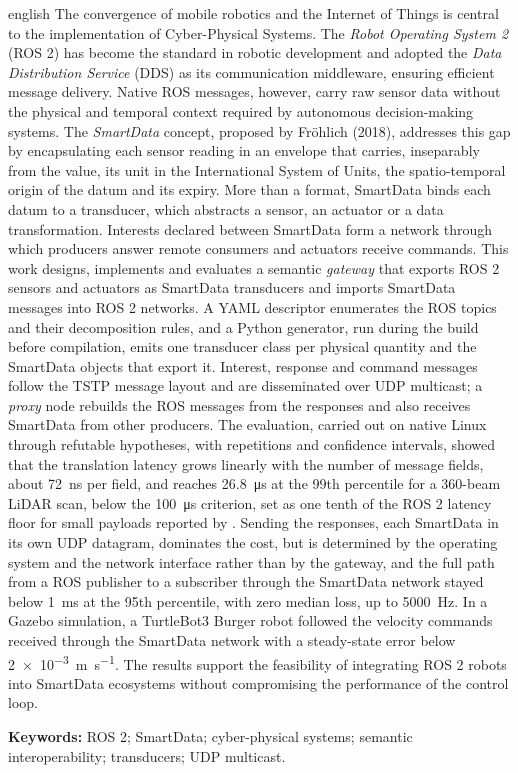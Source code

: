 \documentclass[
    12pt,
    oneside,
    a4paper,
    chapter=TITLE,
    section=TITLE,
    english,
    brazil
]{abntex2}
\begin{document}
\begin{resumo}[Abstract]
\begin{otherlanguage*}{english}
The convergence of mobile robotics and the Internet of Things is central to
the implementation of Cyber-Physical Systems. The \textit{Robot Operating
System 2} (ROS 2) has become the standard in robotic development and adopted
the \textit{Data Distribution Service} (DDS) as its communication middleware,
ensuring efficient message delivery. Native ROS messages, however, carry raw
sensor data without the physical and temporal context required by autonomous
decision-making systems. The \textit{SmartData} concept, proposed by
Fröhlich (2018), addresses this gap by encapsulating each sensor reading in
an envelope that carries, inseparably from the value, its unit in the
International System of Units, the spatio-temporal origin of the datum and
its expiry. More than a format, SmartData binds each datum to a transducer,
which abstracts a sensor, an actuator or a data transformation. Interests
declared between SmartData form a network through which producers answer
remote consumers and actuators receive commands. This work designs,
implements and evaluates a semantic \textit{gateway} that exports ROS 2
sensors and actuators as SmartData transducers and imports SmartData messages
into ROS 2 networks. A YAML descriptor enumerates the ROS topics and their
decomposition rules, and a Python generator, run during the build before
compilation, emits one transducer class per physical quantity and the
SmartData objects that export it. Interest, response and command messages
follow the TSTP message layout and are disseminated over UDP multicast; a
\textit{proxy} node rebuilds the ROS messages from the responses and also
receives SmartData from other producers. The evaluation, carried out on
native Linux through refutable hypotheses, with repetitions and confidence
intervals, showed that the translation latency grows linearly with the
number of message fields, about \SI{72}{\nano\second} per field, and reaches
\SI{26.8}{\micro\second} at the 99th percentile for a 360-beam LiDAR scan,
below the \SI{100}{\micro\second} criterion, set as one tenth of the ROS 2
latency floor for small payloads reported by
. Sending the responses, each SmartData in
its own UDP datagram, dominates the cost, but is determined by the operating
system and the network interface rather than by the gateway, and the full
path from a ROS publisher to a subscriber through the SmartData network
stayed below \SI{1}{\milli\second} at the 95th percentile, with zero median
loss, up to \SI{5000}{\hertz}. In a Gazebo simulation, a TurtleBot3 Burger
robot followed the velocity commands received through the SmartData network
with a steady-state error below \SI{2e-3}{\meter\per\second}. The results
support the feasibility of integrating ROS 2 robots into SmartData
ecosystems without compromising the performance of the control loop.

\vspace{1cm}
\noindent\textbf{Keywords:}
ROS 2; SmartData; cyber-physical systems; semantic interoperability;
transducers; UDP multicast.
\end{otherlanguage*}
\end{resumo}
\end{document}
